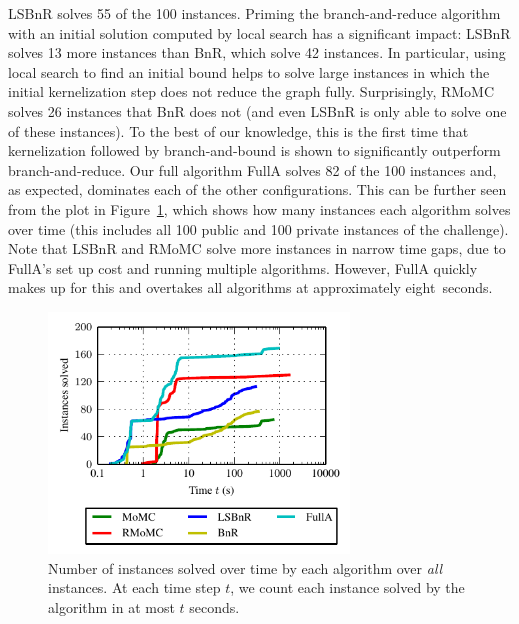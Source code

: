 \documentclass[twoside,leqno,twocolumn]{article}
\newcommand{\AlgName}[1]{\textsf{#1}}
\begin{document}
\AlgName{LSBnR} solves 55 of the 100 instances. Priming the branch-and-reduce algorithm with an initial solution computed by local search has a significant impact: \AlgName{LSBnR} solves 13 more instances than \AlgName{BnR}, which solve 42 instances. In particular, using local search to find an initial bound helps to solve large instances in which the initial kernelization step does not reduce the graph fully. Surprisingly, \AlgName{RMoMC} solves 26 instances that \AlgName{BnR} does not (and even \AlgName{LSBnR} is only able to solve one of these instances). To the best of our knowledge, this is the first time that kernelization followed by branch-and-bound is shown to significantly outperform branch-and-reduce. Our full algorithm \AlgName{FullA} solves 82 of the 100 instances and, as expected, dominates each of the other configurations. This can be further seen from the plot in Figure~\ref{fig:solution_time}, which shows how many instances each algorithm solves over time (this includes all 100 public and 100 private instances of the challenge). Note that \AlgName{LSBnR} and \AlgName{RMoMC} solve more instances in narrow time gaps, due to \AlgName{FullA}'s set up cost and  running multiple algorithms. However, \AlgName{FullA} quickly makes up for this and overtakes all algorithms at approximately eight~seconds.
\begin{figure}
    \centering
    \includegraphics[width=8cm]{plots/rt_solutions_all.pdf}
  \caption{Number of instances solved over time by each algorithm over \emph{all} instances. At each time step $t$, we count each instance solved by the algorithm in at most $t$ seconds.} 
  \vspace*{-.5cm}
  \label{fig:solution_time}
\end{figure}
\end{document}
